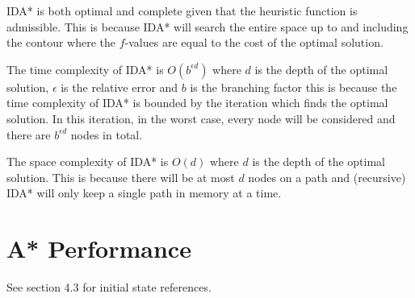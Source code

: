 \documentclass[11pt, oneside]{article}   	%
\begin{document}
IDA* is both optimal and complete given that the heuristic function is admissible.  This is because IDA* will search the entire space up to and including the contour where the $f$-values are equal to the cost of the optimal solution.

The time complexity of IDA* is $O(b^{\epsilon d})$ where $d$ is the depth of the optimal solution, $\epsilon$ is the relative error and $b$ is the branching factor this is because the time complexity of IDA* is bounded by the iteration which finds the optimal solution.  In this iteration, in the worst case, every node will be considered and there are $b^{\epsilon d}$ nodes in total.

The space complexity of IDA* is $O(d)$ where $d$ is the depth of the optimal solution.  This is because there will be at most $d$ nodes on a path and (recursive) IDA* will only keep a single path in memory at a time.

\pagebreak{}

\section{A* Performance}
See section 4.3 for initial state references.
\end{document}
